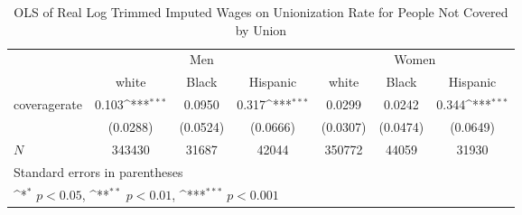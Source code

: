 \begin{table}[htbp]\centering
\def\sym#1{\ifmmode^{#1}\else\(^{#1}\)\fi}
\caption{OLS of Real Log Trimmed Imputed Wages on Unionization Rate for People Not Covered by Union}
\begin{tabular}{l*{6}{c}}
\hline\hline
            &\multicolumn{3}{c}{Men}                                          &\multicolumn{3}{c}{Women}                                        \\\cmidrule(lr){2-4}\cmidrule(lr){5-7}
            &\multicolumn{1}{c}{white}&\multicolumn{1}{c}{Black}&\multicolumn{1}{c}{Hispanic}&\multicolumn{1}{c}{white}&\multicolumn{1}{c}{Black}&\multicolumn{1}{c}{Hispanic}\\
\hline
coveragerate&       0.103\sym{***}&      0.0950         &       0.317\sym{***}&      0.0299         &      0.0242         &       0.344\sym{***}\\
            &    (0.0288)         &    (0.0524)         &    (0.0666)         &    (0.0307)         &    (0.0474)         &    (0.0649)         \\
\hline
\(N\)       &      343430         &       31687         &       42044         &      350772         &       44059         &       31930         \\
\hline\hline
\multicolumn{7}{l}{\footnotesize Standard errors in parentheses}\\
\multicolumn{7}{l}{\footnotesize \sym{*} \(p<0.05\), \sym{**} \(p<0.01\), \sym{***} \(p<0.001\)}\\
\end{tabular}
\end{table}

